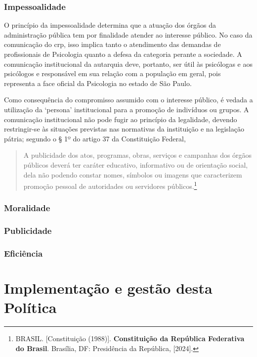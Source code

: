 \subsubsection{Impessoalidade}

O princípio da impessoalidade determina que a atuação dos órgãos da administração pública tem por finalidade atender ao interesse público. No caso da comunicação do \ac{crp}, isso implica tanto o atendimento das demandas de profissionais de Psicologia quanto a defesa da categoria perante a sociedade. A comunicação institucional da autarquia deve, portanto, ser útil às psicólogas e aos psicólogos e responsável em sua relação com a população em geral, pois representa a face oficial da Psicologia no estado de São Paulo.

Como consequência do compromisso assumido com o interesse público, é vedada a utilização da `persona' institucional para a promoção de indivíduos ou grupos. A comunicação institucional não pode fugir ao princípio da legalidade, devendo restringir-se às situações previstas nas normativas da instituição e na legislação pátria; segundo o § 1º do artigo 37 da Constituição Federal,

\begin{quote}
	A publicidade dos atos, programas, obras, serviços e campanhas dos órgãos públicos deverá ter caráter educativo, informativo ou de orientação social, dela não podendo constar nomes, símbolos ou imagens que caracterizem promoção pessoal de autoridades ou servidores públicos.\footnote{BRASIL. [Constituição (1988)]. \textbf{Constituição da República Federativa do Brasil}. Brasília, DF: Presidência da República, [2024].}
\end{quote}

\subsubsection{Moralidade}

\subsubsection{Publicidade}

\subsubsection{Eficiência}


\section{Implementação e gestão desta Política}

